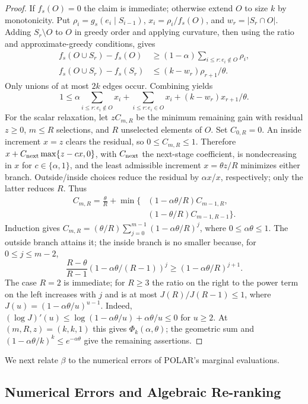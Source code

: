 \documentclass[conference]{IEEEtran}
\theoremstyle{definition}
\newcommand{\POLAR}{\textsc{POLAR}}
\begin{document}
\begin{proof}
If $f_s(O)=0$ the claim is immediate; otherwise extend $O$ to
size $k$ by monotonicity. Put $\rho_i=g_s(e_i\mid S_{i-1})$,
$x_i=\rho_i/f_s(O)$, and $w_r=|S_r\cap O|$. Adding
$S_r\setminus O$ to $O$ in greedy order and applying curvature,
then using the ratio and approximate-greedy conditions, gives
\[
\begin{aligned}
f_s(O\cup S_r)-f_s(O)&\ge(1-\alpha)\sum_{i\le r:e_i\notin O}\rho_i,\\
f_s(O\cup S_r)-f_s(S_r)&\le(k-w_r)\rho_{r+1}/\theta.
\end{aligned}
\]
Only unions of at most $2k$ edges occur. Combining yields
\[
1\le\alpha\sum_{i\le r:e_i\notin O}x_i+
\sum_{i\le r:e_i\in O}x_i+(k-w_r)x_{r+1}/\theta.
\]
For the scalar relaxation, let $zC_{m,R}$ be the minimum
remaining gain with residual $z\ge0$, $m\le R$ selections,
and $R$ unselected elements of $O$. Set $C_{0,R}=0$.
An inside increment $x=z$ clears the residual, so
$0\le C_{m,R}\le1$. Therefore
$x+C_{\rm next}\max\{z-cx,0\}$, with $C_{\rm next}$ the next-stage
coefficient, is nondecreasing in $x$ for
$c\in\{\alpha,1\}$, and the least admissible increment
$x=\theta z/R$ minimizes either branch. Outside/inside choices
reduce the residual by $\alpha x$/$x$, respectively; only the
latter reduces $R$. Thus
\[
\begin{split}
C_{m,R}=\frac\theta R+\min\bigl\{&
(1-\alpha\theta/R)C_{m-1,R},\\
&(1-\theta/R)C_{m-1,R-1}\bigr\}.
\end{split}
\]
Induction gives $C_{m,R}=(\theta/R)\sum_{j=0}^{m-1}(1-\alpha\theta/R)^j$,
where $0\le\alpha\theta\le1$. The outside branch attains it;
the inside branch is no smaller because, for $0\le j\le m-2$,
\[
\frac{R-\theta}{R-1}(1-\alpha\theta/(R-1))^j\ge(1-\alpha\theta/R)^{j+1}.
\]
The case $R=2$ is immediate; for $R\ge3$ the ratio on the
right to the power term on the left increases with $j$ and is
at most $J(R)/J(R-1)\le1$, where $J(u)=(1-\alpha\theta/u)^{u-1}$.
Indeed, $(\log J)'(u)\le\log(1-\alpha\theta/u)+\alpha\theta/u\le0$ for $u\ge2$.
At $(m,R,z)=(k,k,1)$ this gives $\Phi_k(\alpha,\theta)$;
the geometric sum and $(1-\alpha\theta/k)^k\le e^{-\alpha\theta}$
give the remaining assertions.
\end{proof}

We next relate $\beta$ to the numerical errors
of \POLAR{}'s marginal evaluations.

\subsection{Numerical Errors and Algebraic Re-ranking}
\label{sec:numerical-errors}
\end{document}
